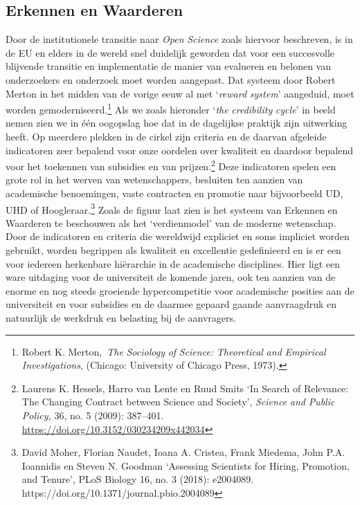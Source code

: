 \documentclass[smallauthor, chapterhaspagenum, nochapterinheader, pagenuminheader,  bigchapnum,medium2, tocpages,  garamond, titleinheader]{jote-book}
\begin{document}
	\subsection{Erkennen en Waarderen}



	Door de institutionele transitie naar \emph{Open }\emph{Science} zoals hiervoor beschreven, is in de EU en elders in de wereld snel duidelijk geworden dat voor een succesvolle blijvende transitie en implementatie de manier van evalueren en belonen van onderzoekers en onderzoek moet worden aangepast. Dat systeem door Robert Merton in het midden van de vorige eeuw al met ‘\emph{reward}\emph{ system}' aangeduid, moet worden gemoderniseerd.\footnote{Robert K. Merton, \emph{The }\emph{Sociology}\emph{ of }\emph{Science}\emph{: }\emph{Theoretical}\emph{ }\emph{and}\emph{ }\emph{Empirical}\emph{ }\emph{Investigations}, (Chicago: University of Chicago Press, 1973).} Als we zoals hieronder ‘\emph{the}\emph{ }\emph{credibility}\emph{ }\emph{cycle}' in beeld nemen zien we in één oogopslag hoe dat in de dagelijkse praktijk zijn uitwerking heeft. Op meerdere plekken in de cirkel zijn criteria en de daarvan afgeleide indicatoren zeer bepalend voor onze oordelen over kwaliteit en daardoor bepalend voor het toekennen van subsidies en van prijzen.\footnote{Laurens K. Hessels, Harro van Lente en Ruud Smits ‘In Search of Relevance: The Changing Contract between Science and Society', \emph{Science}\emph{ }\emph{and}\emph{ Public Policy, }36, no. 5 (2009): 387--401. \href{https://doi.org/10.3152/030234209x442034}{https://doi.org/10.3152/030234209x442034}} Deze indicatoren spelen een grote rol in het werven van wetenschappers, besluiten ten aanzien van academische benoemingen, vaste contracten en promotie naar bijvoorbeeld UD, UHD of Hoogleraar.\footnote{David Moher, Florian Naudet, Ioana A. Cristea, Frank Miedema, John P.A. Ioannidis en Steven N. Goodman ‘Assessing Scientists for Hiring, Promotion, and Tenure', PLoS Biology 16, no. 3 (2018): e2004089. https://doi.org/10.1371/journal.pbio.2004089} Zoals de figuur laat zien is het systeem van Erkennen en Waarderen te beschouwen als het ‘verdienmodel' van de moderne wetenschap. Door de indicatoren en criteria die wereldwijd expliciet en soms impliciet worden gebruikt, worden begrippen als kwaliteit en excellentie gedefinieerd en is er een voor iedereen herkenbare hiërarchie in de academische disciplines. Hier ligt een ware uitdaging voor de universiteit de komende jaren, ook ten aanzien van de enorme en nog steeds groeiende hypercompetitie voor academische posities aan de universiteit en voor subsidies en de daarmee gepaard gaande aanvraagdruk en natuurlijk de werkdruk en belasting bij de aanvragers.
\end{document}

